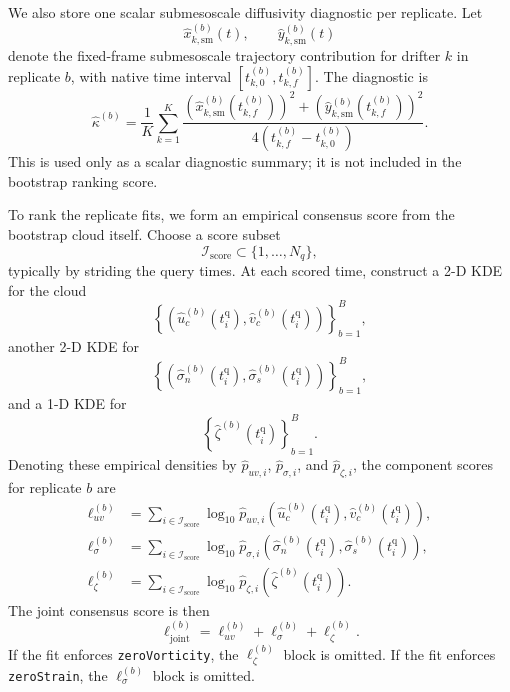 \documentclass{article}
\begin{document}
We also store one scalar submesoscale diffusivity diagnostic per
replicate. Let
\begin{equation}
\hat{x}_{k,\mathrm{sm}}^{(b)}(t), \qquad \hat{y}_{k,\mathrm{sm}}^{(b)}(t)
\end{equation}
denote the fixed-frame submesoscale trajectory contribution for drifter
$k$ in replicate $b$, with native time interval
$[t_{k,0}^{(b)}, t_{k,f}^{(b)}]$. The diagnostic is
\begin{equation}
\hat{\kappa}^{(b)}
=
\frac{1}{K}
\sum_{k=1}^{K}
\frac{
\left(\hat{x}_{k,\mathrm{sm}}^{(b)}(t_{k,f}^{(b)})\right)^2
+
\left(\hat{y}_{k,\mathrm{sm}}^{(b)}(t_{k,f}^{(b)})\right)^2
}{
4\left(t_{k,f}^{(b)}-t_{k,0}^{(b)}\right)
}.
\end{equation}
This is used only as a scalar diagnostic summary; it is not included in
the bootstrap ranking score.

To rank the replicate fits, we form an empirical consensus score from the
bootstrap cloud itself. Choose a score subset
\begin{equation}
\mathcal{I}_{\mathrm{score}} \subset \{1,\dots,N_q\},
\end{equation}
typically by striding the query times. At each scored time, construct a
2-D KDE for the cloud
\begin{equation}
\left\{
\left(\hat{u}_c^{(b)}(t_i^{\mathrm{q}}), \hat{v}_c^{(b)}(t_i^{\mathrm{q}})\right)
\right\}_{b=1}^{B},
\end{equation}
another 2-D KDE for
\begin{equation}
\left\{
\left(\hat{\sigma}_n^{(b)}(t_i^{\mathrm{q}}), \hat{\sigma}_s^{(b)}(t_i^{\mathrm{q}})\right)
\right\}_{b=1}^{B},
\end{equation}
and a 1-D KDE for
\begin{equation}
\left\{
\hat{\zeta}^{(b)}(t_i^{\mathrm{q}})
\right\}_{b=1}^{B}.
\end{equation}
Denoting these empirical densities by
$\hat{p}_{uv,i}$, $\hat{p}_{\sigma,i}$, and $\hat{p}_{\zeta,i}$, the
component scores for replicate $b$ are
\begin{align}
\ell_{uv}^{(b)}
&=
\sum_{i \in \mathcal{I}_{\mathrm{score}}}
\log_{10}
\hat{p}_{uv,i}
\!\left(
\hat{u}_c^{(b)}(t_i^{\mathrm{q}}),
\hat{v}_c^{(b)}(t_i^{\mathrm{q}})
\right),
\\
\ell_{\sigma}^{(b)}
&=
\sum_{i \in \mathcal{I}_{\mathrm{score}}}
\log_{10}
\hat{p}_{\sigma,i}
\!\left(
\hat{\sigma}_n^{(b)}(t_i^{\mathrm{q}}),
\hat{\sigma}_s^{(b)}(t_i^{\mathrm{q}})
\right),
\\
\ell_{\zeta}^{(b)}
&=
\sum_{i \in \mathcal{I}_{\mathrm{score}}}
\log_{10}
\hat{p}_{\zeta,i}
\!\left(
\hat{\zeta}^{(b)}(t_i^{\mathrm{q}})
\right).
\end{align}
The joint consensus score is then
\begin{equation}
\ell_{\mathrm{joint}}^{(b)}
=
\ell_{uv}^{(b)}
+
\ell_{\sigma}^{(b)}
+
\ell_{\zeta}^{(b)}.
\end{equation}
If the fit enforces \texttt{zeroVorticity}, the $\ell_{\zeta}^{(b)}$
block is omitted. If the fit enforces \texttt{zeroStrain}, the
$\ell_{\sigma}^{(b)}$ block is omitted.
\end{document}
